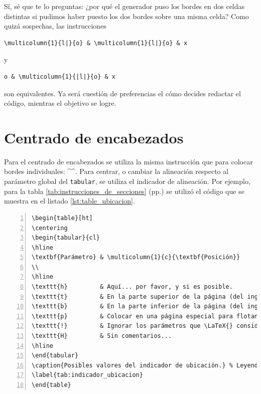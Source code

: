 Sí, sé que te lo preguntas: ¿por qué el generador puso los bordes en dos celdas distintas si pudimos haber puesto los dos bordes sobre una misma celda? Como quizá sospechas, las instrucciones

\begin{lstlisting}[style=latex,numbers=none]
\multicolumn{1}{l|}{o} & \multicolumn{1}{l|}{o} & x
\end{lstlisting}

\noindent y

\begin{lstlisting}[style=latex,numbers=none]
o & \multicolumn{1}{|l|}{o} & x
\end{lstlisting}

\noindent son equivalentes. Ya será cuestión de preferencias el cómo decides redactar el código, mientras el objetivo se logre.


\section{Centrado de encabezados}
\label{sec:centrado_de_encabezados}



Para el centrado de encabezados se utiliza la misma instrucción que para colocar bordes individuales: ^\multicolumn^. Para centrar, o cambiar la alineación respecto al parámetro global del \texttt{tabular}, se utiliza el indicador de alineación. Por ejemplo, para la tabla \ref{tab:instrucciones_de_secciones} (pp.\pageref{tab:instrucciones_de_secciones}) se utilizó el código que se muestra en el listado \ref{lst:table_ubicacion}.

\begin{lstlisting}[style=latex,numbers=left,caption={Código de tabla de indicadores de ubicación.},label={lst:table_ubicacion},
linebackgroundcolor={%
	\ifnum \value{lstnumber} =  5 \color{codigo_linea_resaltada}
	\else \color{codigo_fondo}
	\fi % Tantos \fi como líneas subrayadas.
}]
\begin{table}[ht]
\centering
\begin{tabular}{cl}
\hline
\textbf{Parámetro} & \multicolumn{1}{c}{\textbf{Posición}}
\\
\hline
\texttt{h}         & Aquí... por favor, y si es posible.                           \\
\texttt{t}         & En la parte superior de la página (del inglés \emph{top}).    \\
\texttt{b}         & En la parte inferior de la página (del inglés \emph{bottom}). \\
\texttt{p}         & Colocar en una página especial para flotantes.                \\
\texttt{!}         & Ignorar los parámetros que \LaTeX{} considera buenos.         \\
\texttt{H}         & Sin comentarios...                                            \\
\hline
\end{tabular}
\caption{Posibles valores del indicador de ubicación.} % Leyenda de la tabla.
\label{tab:indicador_ubicacion}
\end{table}
\end{lstlisting}

